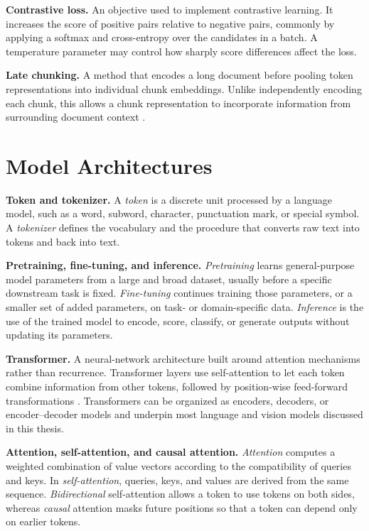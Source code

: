 \noindent\textbf{Contrastive loss.}
An objective used to implement contrastive learning. It increases the score of
positive pairs relative to negative pairs, commonly by applying a softmax and
cross-entropy over the candidates in a batch. A temperature parameter may
control how sharply score differences affect the loss.

\noindent\textbf{Late chunking.}
A method that encodes a long document before pooling token representations into
individual chunk embeddings. Unlike independently encoding each chunk, this
allows a chunk representation to incorporate information from surrounding
document context .

\section*{Model Architectures}

\noindent\textbf{Token and tokenizer.}
A \emph{token} is a discrete unit processed by a language model, such as a word,
subword, character, punctuation mark, or special symbol. A \emph{tokenizer}
defines the vocabulary and the procedure that converts raw text into tokens and
back into text.

\noindent\textbf{Pretraining, fine-tuning, and inference.}
\emph{Pretraining} learns general-purpose model parameters from a large and
broad dataset, usually before a specific downstream task is fixed.
\emph{Fine-tuning} continues training those parameters, or a smaller set of
added parameters, on task- or domain-specific data. \emph{Inference} is the use
of the trained model to encode, score, classify, or generate outputs without
updating its parameters.

\noindent\textbf{Transformer.}
A neural-network architecture built around attention mechanisms rather than
recurrence. Transformer layers use self-attention to let each token combine
information from other tokens, followed by position-wise feed-forward
transformations . Transformers can be organized
as encoders, decoders, or encoder--decoder models and underpin most language and
vision models discussed in this thesis.

\noindent\textbf{Attention, self-attention, and causal attention.}
\emph{Attention} computes a weighted combination of value vectors according to
the compatibility of queries and keys. In \emph{self-attention}, queries, keys,
and values are derived from the same sequence. \emph{Bidirectional} self-attention
allows a token to use tokens on both sides, whereas \emph{causal} attention masks
future positions so that a token can depend only on earlier tokens.

